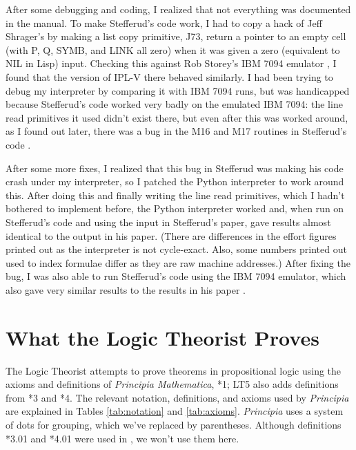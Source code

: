 \documentclass[journal]{IEEEtran}
\begin{document}
After some debugging and coding, I realized that not
everything was documented in the manual.
To make Stefferud's code work, I had to copy a hack of Jeff 
Shrager's by making a list copy primitive, J73, return a pointer
to an empty cell (with P, Q, SYMB, and LINK all zero) when it was given
a zero (equivalent to NIL in Lisp) input.  Checking this against Rob 
Storey's IBM 7094 emulator \cite{ibsys}, I found that the version of IPL-V there
behaved similarly.  I had been trying to debug my interpreter by comparing
it with IBM 7094 runs, but was handicapped because Stefferud's code
worked very badly on the emulated IBM 7094: the line read primitives
it used didn't exist there, but even after this was worked around,
as I found out later, there was a bug in the M16 and M17 routines
in Stefferud's code \cite{moewsrepo2}.

After some more fixes, I realized that
this bug in Stefferud was making his code crash under my
interpreter, so
I patched the Python interpreter to work around this.
After doing this and finally writing the line read primitives,
which I hadn't bothered to implement before, the Python interpreter
worked and, when run on Stefferud's code and using the input in Stefferud's
paper, gave results almost identical to the output in his paper.
(There are differences in the effort figures printed out as the
interpreter is not cycle-exact.  Also, some numbers printed out
used to index formulae differ as they are raw machine addresses.)
After fixing the bug, I was also able to run Stefferud's code using
the IBM 7094 emulator, which also gave very similar results to the
results in his paper \cite{moewsrepo2}.

%
% 

\section{What the Logic Theorist Proves}
\label{sec:results}

The Logic Theorist attempts to prove theorems in propositional logic
using the axioms and definitions of \textit{Principia Mathematica}, 
*1; LT5 also adds definitions from *3 and 
*4.  The relevant notation, definitions, and axioms used by \textit{Principia}
are explained in Tables \ref{tab:notation} and \ref{tab:axioms}.
{\em Principia} uses a system of dots for grouping, which we've
replaced by parentheses.
Although definitions *3.01 and *4.01 were used in \cite{stefferud1963lt},
we won't use them here.
\end{document}
